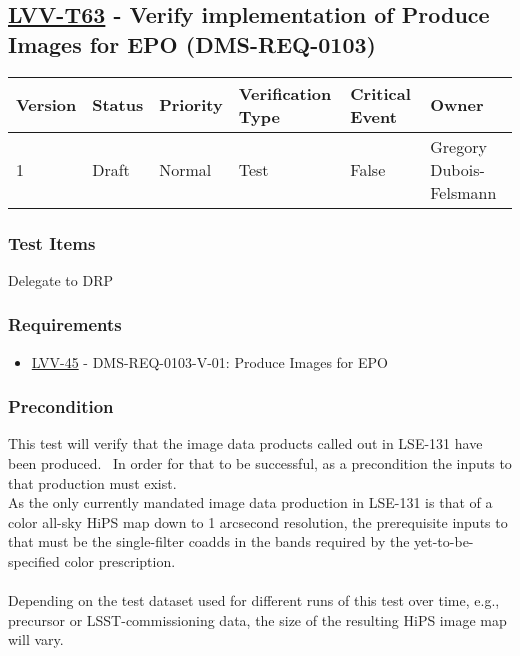 \hypertarget{lvv-t63---verify-implementation-of-produce-images-for-epo-dms-req-0103}{%
\subsection{\texorpdfstring{\href{https://jira.lsstcorp.org/secure/Tests.jspa\#/testCase/LVV-T63}{LVV-T63}
- Verify implementation of Produce Images for EPO
(DMS-REQ-0103)}{LVV-T63 - Verify implementation of Produce Images for EPO (DMS-REQ-0103)}}\label{lvv-t63---verify-implementation-of-produce-images-for-epo-dms-req-0103}}

\begin{longtable}[]{@{}llllll@{}}
\toprule
Version & Status & Priority & Verification Type & Critical Event &
Owner\tabularnewline
\midrule
\endhead
1 & Draft & Normal & Test & False & Gregory
Dubois-Felsmann\tabularnewline
\bottomrule
\end{longtable}

\hypertarget{test-items-39}{%
\subsubsection{Test Items}\label{test-items-39}}

Delegate to DRP

\hypertarget{requirements-40}{%
\subsubsection{Requirements}\label{requirements-40}}

\begin{itemize}
\tightlist
\item
  \href{https://jira.lsstcorp.org/browse/LVV-45}{LVV-45} -
  DMS-REQ-0103-V-01: Produce Images for EPO
\end{itemize}

\hypertarget{precondition-3}{%
\subsubsection{Precondition}\label{precondition-3}}

This test will verify that the image data products called out in LSE-131
have been produced. ~In order for that to be successful, as a
precondition the inputs to that production must exist.\\
As the only currently mandated image data production in LSE-131 is that
of a color all-sky HiPS map down to 1 arcsecond resolution, the
prerequisite inputs to that must be the single-filter coadds in the
bands required by the yet-to-be-specified color prescription.\\
~\\
Depending on the test dataset used for different runs of this test over
time, e.g., precursor or LSST-commissioning data, the size of the
resulting HiPS image map will vary.

